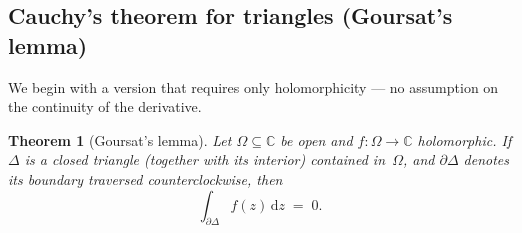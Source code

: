 \documentclass[12pt,a4paper,openany]{book}
\theoremstyle{definition}
\theoremstyle{plain}
\newtheorem{theorem}[definition]{Theorem}
\theoremstyle{remark}
\newcommand{\C}{\mathbb{C}}
\newcommand{\dd}{\mathrm{d}}
\begin{document}
\subsection{Cauchy's theorem for triangles (Goursat's lemma)}

We begin with a version that requires only holomorphicity --- no assumption on
the continuity of the derivative.

\begin{theorem}[Goursat's lemma]\label{thm:goursat}
Let $\Omega\subseteq\C$ be open and $f\colon\Omega\to\C$ holomorphic.  If
$\Delta$ is a closed triangle (together with its interior) contained
in~$\Omega$, and $\partial\Delta$ denotes its boundary traversed
counterclockwise, then
\[
  \int_{\partial\Delta} f(z)\,\dd z \;=\; 0.
\]
\end{theorem}
\end{document}
